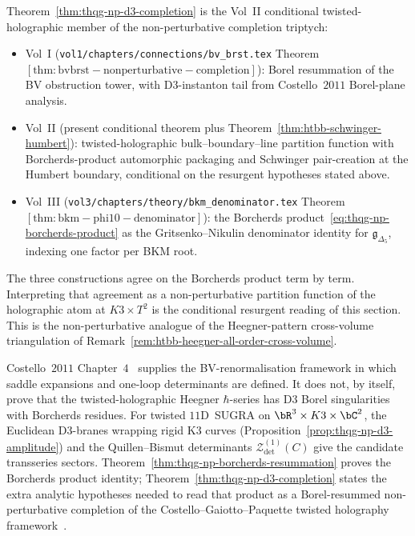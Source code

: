 \begin{remark}
\label{rem:thqg-np-cross-volume}
Theorem~\ref{thm:thqg-np-d3-completion} is the Vol~II conditional
twisted-holographic member of the non-perturbative completion
triptych:
\begin{itemize}[leftmargin=1.8em]
\item Vol~I (\texttt{vol1/chapters/connections/bv\_brst.tex}
Theorem~$\mathrm{[thm:bvbrst-nonperturbative-completion]}$): Borel
resummation of the BV obstruction tower, with D$3$-instanton tail
from Costello~$2011$ Borel-plane analysis.
\item Vol~II (present conditional theorem plus
Theorem~\ref{thm:htbb-schwinger-humbert}): twisted-holographic
bulk--boundary--line partition function with Borcherds-product
automorphic packaging and Schwinger pair-creation at the Humbert
boundary, conditional on the resurgent hypotheses stated above.
\item Vol~III
(\texttt{vol3/chapters/theory/bkm\_denominator.tex}
Theorem~$\mathrm{[thm:bkm-phi10-denominator]}$): the Borcherds
product~\eqref{eq:thqg-np-borcherds-product} as the
Gritsenko--Nikulin denominator identity for $\mathfrak{g}_{\Delta_5}$,
indexing one factor per BKM root.
\end{itemize}
The three constructions agree on the Borcherds product term by term.
Interpreting that agreement as a non-perturbative partition function
of the holographic atom at $K3\times T^2$ is the conditional
resurgent reading of this section. This is the
non-perturbative analogue of the Heegner-pattern cross-volume
triangulation of Remark~\ref{rem:htbb-heegner-all-order-cross-volume}.
\end{remark}

\begin{remark}
\label{rem:thqg-np-costello-renorm}
Costello~$2011$ Chapter~$4$~\cite[Ch.~4]{costello-renormalization} supplies the
BV-renormalisation framework in which saddle expansions and
one-loop determinants are defined. It does not, by itself, prove that
the twisted-holographic Heegner $\hbar$-series has D$3$ Borel
singularities with Borcherds residues. For twisted $11$D~SUGRA on
$\bR^3\times K3\times\bC^2$, the Euclidean D$3$-branes wrapping rigid
K$3$ curves (Proposition~\ref{prop:thqg-np-d3-amplitude}) and the
Quillen--Bismut determinants $\mathcal{Z}^{(1)}_{\det}(C)$ give the
candidate transseries sectors. Theorem~\ref{thm:thqg-np-borcherds-resummation}
proves the Borcherds product identity; Theorem~\ref{thm:thqg-np-d3-completion}
states the extra analytic hypotheses needed to read that product as a
Borel-resummed non-perturbative completion of the
Costello--Gaiotto--Paquette twisted holography
framework~\cite{CostelloGaiottoPaquette2018}.
\end{remark}

